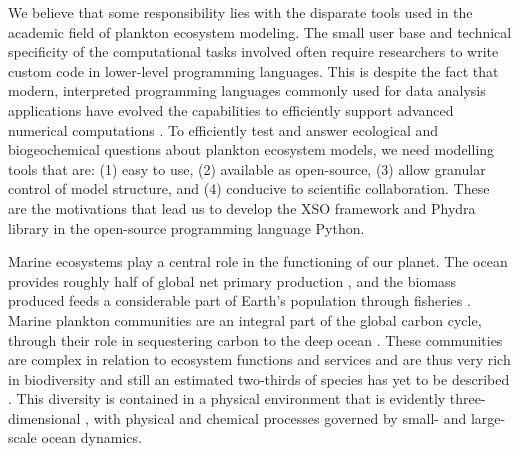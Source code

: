 \documentclass[journal abbreviation, manuscript]{copernicus}
\begin{document}
We believe that some responsibility lies with the disparate tools used in the academic field of plankton ecosystem modeling. The small user base and technical specificity of the computational tasks involved often require researchers to write custom code in lower-level programming languages. This is despite the fact that modern, interpreted programming languages commonly used for data analysis applications have evolved the capabilities to efficiently support advanced numerical computations \citep{Lin2012}. 
To efficiently test and answer ecological and biogeochemical questions about plankton ecosystem models, we need modelling tools that are: (1) easy to use, (2) available as open-source, (3) allow granular control of model structure, and (4) conducive to scientific collaboration. These are the motivations that lead us to develop the XSO framework and Phydra library in the open-source programming language Python.

Marine ecosystems play a central role in the functioning of our planet. The ocean provides roughly half of global net primary production \citep{Field1998PrimaryComponents}, and the biomass produced feeds a considerable part of Earth’s population through fisheries \citep{Stock2017}. Marine plankton communities are an integral part of the global carbon cycle, through their role in sequestering carbon to the deep ocean \citep{Falkowski1998BiogeochemicalProduction}. These communities are complex in relation to ecosystem functions and services and are thus very rich in biodiversity and still an estimated two-thirds of species has yet to be described \citep{Appeltans2012TheDiversity}. This diversity is contained in a physical environment that is evidently three-dimensional \citep{Levin2017AddingConservation}, with physical and chemical processes governed by small- and large-scale ocean dynamics. 
\end{document}
